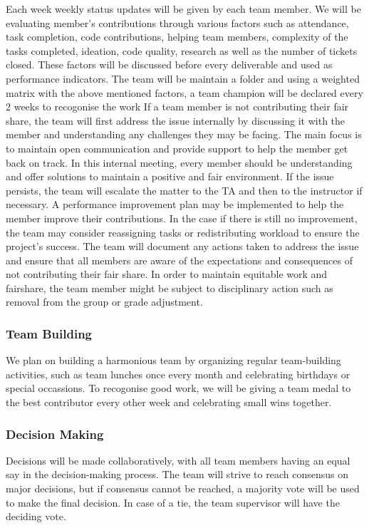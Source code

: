 \documentclass{article}
\begin{document}
\noindent Each week weekly status updates will be given by each team member. We will be evaluating member's contributions through various factors such as 
attendance, task completion, code contributions, helping team members, complexity of the tasks completed, ideation, code quality, research as well as the number of tickets closed. These
factors will be discussed before every deliverable and used as performance indicators. The team will be maintain a folder and using a weighted matrix with the above mentioned factors, a team champion will be declared every 2 weeks to recogonise the work
\noindent If a team member is not contributing their fair share, the team will first address the issue internally by discussing it with the member and understanding any challenges they may be facing.
The main focus is to maintain open communication and provide support to help the member get back on track. In this internal meeting, every member should be understanding and offer solutions to maintain a positive and fair environment. If the issue persists, the team will escalate the matter to the TA and then to the instructor if necessary. A performance improvement plan may be implemented to help the member improve their contributions. In the case if there is still no improvement,
the team may consider reassigning tasks or redistributing workload to ensure the project's success. The team will document any actions taken to address the issue and ensure that all members are aware of the expectations and consequences of not contributing their fair share.
In order to maintain equitable work and fairshare, the team member might be subject to disciplinary action such as removal from the group or grade adjustment.

\subsubsection*{Team Building}

We plan on building a harmonious team by organizing regular team-building activities, such as team lunches once every month and celebrating birthdays or special occassions. 
To recogonise good work, we will be giving a team medal to the best contributor every other week and celebrating small wins together. 

\subsubsection*{Decision Making} 

Decisions will be made collaboratively, with all team members having an equal say in the decision-making process. The team will strive to reach consensus on major decisions,
but if consensus cannot be reached, a majority vote will be used to make the final decision. In case of a tie, the team supervisor will have the deciding vote.
\end{document}
